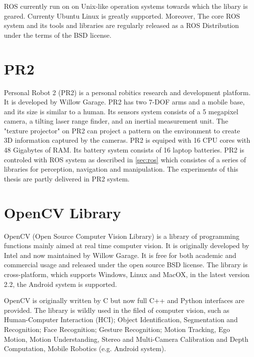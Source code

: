 ROS currently run on on Unix-like operation systems towards which the libary is
geared. Currenty Ubuntu Linux is greatly supported. Moreover, The core
ROS system and its tools and libraries are regularly released as a ROS
Distribution\cite{rosintroduction} under the terms of the BSD license.

\section{PR2}
\label{sec:pr2}
Personal Robot 2 (PR2) is a personal robitics research and development
platform.  It is developed by Willow Garage.  PR2 has two 7-DOF arms and a mobile
base, and its size  is similar to a human. Its sensors system consists of a 5
megapixel camera, a tilting laser range finder, and an inertial
measurement unit. The "texture projector" on PR2 can project a pattern
on the environment to create 3D information captured by the
cameras. PR2 is equiped with 16 CPU cores with 48 Gigabytes of
RAM. Its battery system consists of 16 laptop batteries. PR2 is
controled with ROS system as described  in \ref{sec:ros} which
consistes of a series of libraries for perception, navigation and
manipulation.
The experiments of this thesis are partly delivered in PR2 system.

\section{OpenCV Library}
\label{sec:opencv}

OpenCV (Open Source Computer Vision Library) is a library of
programming functions mainly aimed at real time computer vision. It is
originally developed by Intel and now maintained by Willow Garage. It
is free for both academic and commercial usage and released  under the
open source BSD license. The library is cross-platform, which supports
Windows, Linux and MacOX,  in the latest version 2.2, the Android
system is supported.

OpenCV is originally written by C but now full C++ and Python
interfaces are provided. The library is wildly used in the filed of
computer vision, such as Human-Computer Interaction (HCI); Object
Identification, Segmentation and Recognition; Face Recognition;
Gesture Recognition; Motion Tracking, Ego Motion, Motion
Understanding, Stereo and Multi-Camera
Calibration and Depth Computation, Mobile Robotics (e.g. Android
system).

